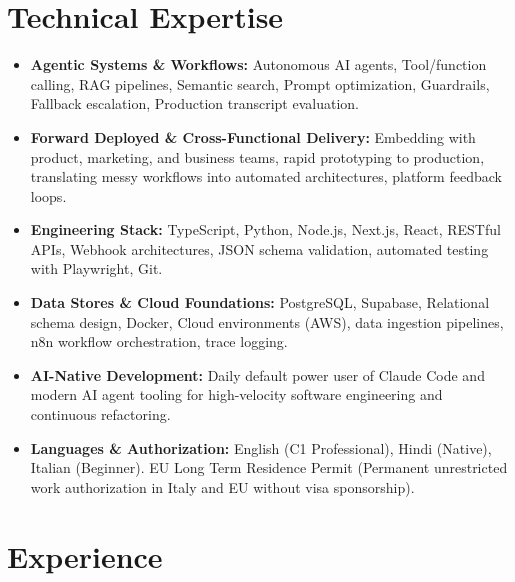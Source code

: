 \documentclass[10pt,a4paper]{article}
\begin{document}
\section{Technical Expertise}
\begin{itemize}
  \item \textbf{Agentic Systems \& Workflows:} Autonomous AI agents, Tool/function calling, RAG pipelines, Semantic search, Prompt optimization, Guardrails, Fallback escalation, Production transcript evaluation.
  \item \textbf{Forward Deployed \& Cross-Functional Delivery:} Embedding with product, marketing, and business teams, rapid prototyping to production, translating messy workflows into automated architectures, platform feedback loops.
  \item \textbf{Engineering Stack:} TypeScript, Python, Node.js, Next.js, React, RESTful APIs, Webhook architectures, JSON schema validation, automated testing with Playwright, Git.
  \item \textbf{Data Stores \& Cloud Foundations:} PostgreSQL, Supabase, Relational schema design, Docker, Cloud environments (AWS), data ingestion pipelines, n8n workflow orchestration, trace logging.
  \item \textbf{AI-Native Development:} Daily default power user of Claude Code and modern AI agent tooling for high-velocity software engineering and continuous refactoring.
  \item \textbf{Languages \& Authorization:} English (C1 Professional), Hindi (Native), Italian (Beginner). EU Long Term Residence Permit (Permanent unrestricted work authorization in Italy and EU without visa sponsorship).
\end{itemize}

\section{Experience}
\end{document}

